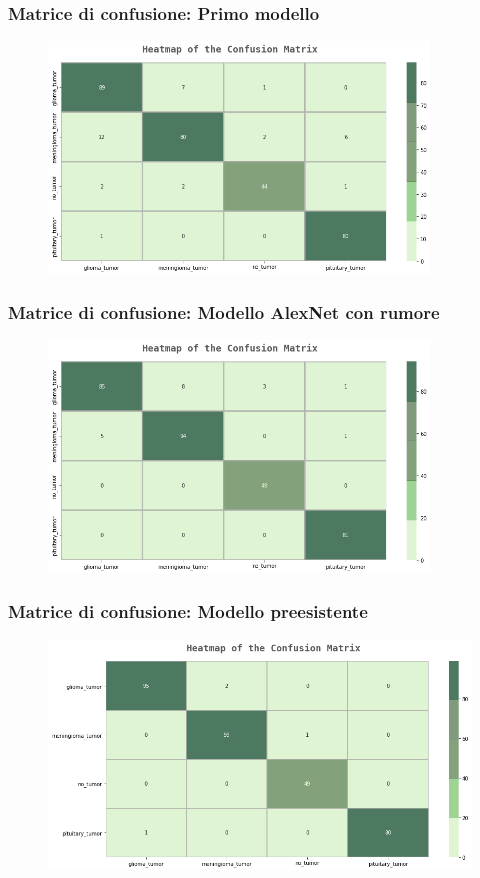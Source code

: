 \documentclass{beamer}
\begin{document}
\begin{frame}
	\frametitle{Matrice di confusione: Primo modello}
	\begin{figure}
		\includegraphics[width=0.9\textwidth]{conf-matrix-first.png}
	\end{figure}
\end{frame}

\begin{frame}
\frametitle{Matrice di confusione: Modello AlexNet con rumore}
\begin{figure}
	\includegraphics[width=0.9\textwidth]{conf-matrix-alex.png}
\end{figure}

\end{frame}


\begin{frame}
\frametitle{Matrice di confusione: Modello preesistente}
\begin{figure}

	\includegraphics[width=1\textwidth]{conf-matrix-pretrained.png}
\end{figure}
\end{frame}
\end{document}
